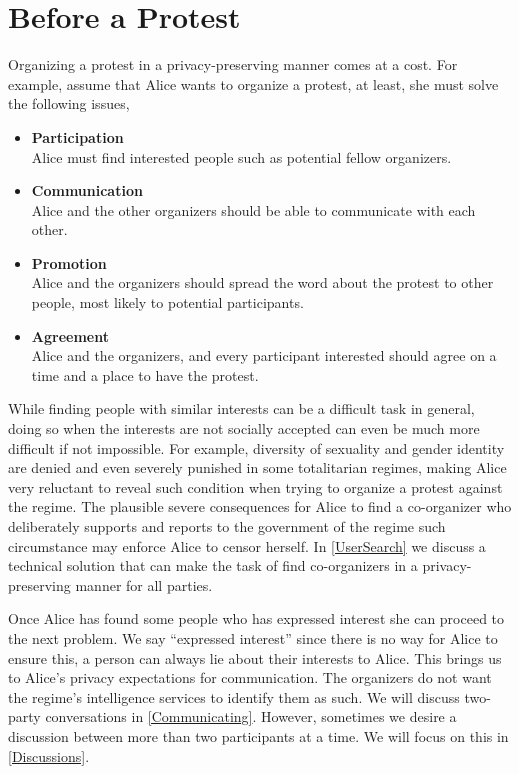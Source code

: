 \section{Before a Protest}
\label{BeforeProtest}
Organizing a protest in a privacy-preserving manner comes at a cost. For example, 
assume that Alice wants to organize a protest, at least, she must solve the following 
issues,
\begin{itemize}
    \item \textbf{Participation}\\
    Alice must find interested people such as potential fellow organizers.
    
    \item \textbf{Communication}\\
    Alice and the other organizers should be able to communicate with each other.
    
    \item \textbf{Promotion}\\
    Alice and the organizers should spread the word about the protest to other people, 
    most likely to potential participants.
    
    \item \textbf{Agreement}\\
    Alice and the organizers, and every participant interested should agree on a 
    time and a place to have the protest.
\end{itemize}

While finding people with similar interests can be a difficult task in general, 
doing so when the interests are not socially accepted can even be much more difficult 
if not impossible. For example, diversity of sexuality and gender identity are denied 
and even severely punished in some totalitarian regimes, making Alice very reluctant 
to reveal such condition when trying to organize a protest against the regime. The 
plausible severe consequences for Alice to find a co-organizer who deliberately 
supports and reports to the government of the regime such circumstance may enforce 
Alice to censor herself. In \cref{UserSearch} we discuss a technical solution that 
can make the task of find co-organizers in a privacy-preserving manner for all parties.

Once Alice has found some people who has expressed interest she can proceed to 
the next problem.
We say \enquote{expressed interest} since there is no way for Alice to ensure 
this, a person can always lie about their interests to Alice.
This brings us to Alice's privacy expectations for communication.
The organizers do not want the regime's intelligence services to identify them 
as such.
We will discuss two-party conversations in \cref{Communicating}.
However, sometimes we desire a discussion between more than two participants at 
a time.
We will focus on this in \cref{Discussions}.

